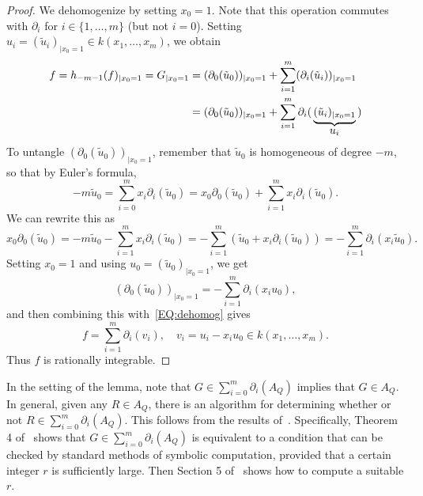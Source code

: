 \documentclass{amsart}
\theoremstyle{definition}
\numberwithin{equation}{section}
\numberwithin{thm}{section}
\begin{document}
\begin{proof}
We dehomogenize by setting $x_0 = 1$.  Note that this operation commutes with $\partial_i$ for $i \in \{1,\dots,m\}$ (but not $i =0$).  Setting $u_i = (\tilde u_i)_{|x_0=1} \in k(x_1,\dots,x_m)$, we obtain
\begin{equation}
\label{EQ:dehomog}
\begin{aligned}
f = h_{-m-1}(f)_{|x_0=1} = G_{|x_0=1} &= (\partial_0(\tilde u_0))_{|x_0=1} + \sum_{i=1}^m (\partial_i(\tilde u_i))_{|x_0=1}\\
&= (\partial_0(\tilde u_0))_{|x_0=1} + \sum_{i=1}^m \partial_i(\,\underbrace{(\tilde u_i)_{|x_0=1}}_{\text{\normalsize $u_i$}}\,)\\ 
\end{aligned}
\end{equation}
To untangle $(\partial_0(\tilde u_0))_{|x_0=1}$, remember that $\tilde u_0$ is homogeneous of degree $-m$, so that by Euler's formula, 
\[
-m \tilde u_0 = \sum_{i=0}^m x_i \partial_i( \tilde u_0) = x_0\partial_0( \tilde u_0) + \sum_{i=1}^m x_i \partial_i( \tilde u_0).
\]
We can rewrite this as
\[
x_0 \partial_0( \tilde u_0) = -m\tilde u_0 - \sum_{i=1}^m x_i \partial_i( \tilde u_0)
=-\sum_{i=1}^m (\tilde u_0 + x_i \partial_i( \tilde u_0)) = -\sum_{i=1}^m \partial_i(x_i  \tilde u_0).
\]
Setting $x_0 = 1$ and using $u_0 = (\tilde u_0)_{|x_0=1}$, we get
\[
(\partial_0(\tilde u_0))_{|x_0=1} = -\sum_{i=1}^m \partial_i(x_i  u_0),
\]
and then combining this with~\eqref{EQ:dehomog} gives
\[
f =  \sum_{i=1}^m \partial_i(v_i), \quad v_i = u_i - x_i u_0 \in k(x_1,\dots,x_m).
\]
Thus $f$ is rationally integrable.
\end{proof}

In the setting of the lemma, note that $G \in \sum_{i=0}^m \partial_i(A_Q)$ implies that $G \in A_Q$.  In general, given any $R \in A_Q$, there is an algorithm for determining whether or not $R \in \sum_{i=0}^m \partial_i(A_Q)$.  This follows from the results of~\cite{Lairez2016}.  Specifically, Theorem 4 of~\cite{Lairez2016} shows that $G \in \sum_{i=0}^m \partial_i(A_Q)$ is equivalent to a condition that can be checked by standard methods of symbolic computation, provided that a certain integer $r$ is sufficiently large.  Then Section 5 of~\cite{Lairez2016} shows how to compute a suitable $r$.

\end{document}
